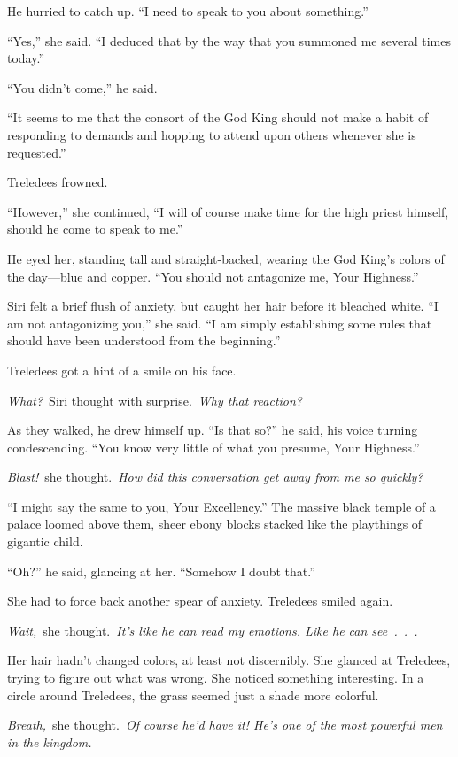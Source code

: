 He hurried to catch up. “I need to speak to you about something.”

“Yes,” she said. “I deduced that by the way that you summoned me several times today.”

“You didn’t come,” he said.

“It seems to me that the consort of the God King should not make a habit of responding to demands and hopping to attend upon others whenever she is requested.”

Treledees frowned.

“However,” she continued, “I will of course make time for the high priest himself, should he come to speak to me.”

He eyed her, standing tall and straight-backed, wearing the God King’s colors of the day—blue and copper. “You should not antagonize me, Your Highness.”

Siri felt a brief flush of anxiety, but caught her hair before it bleached white. “I am not antagonizing you,” she said. “I am simply establishing some rules that should have been understood from the beginning.”

Treledees got a hint of a smile on his face.

\textit{What?}~Siri thought with surprise.~\textit{Why that reaction?}

As they walked, he drew himself up. “Is that so?” he said, his voice turning condescending. “You know very little of what you presume, Your Highness.”

\textit{Blast!}~she thought.~\textit{How did this conversation get away from me so quickly?}

“I might say the same to you, Your Excellency.” The massive black temple of a palace loomed above them, sheer ebony blocks stacked like the playthings of gigantic child.

“Oh?” he said, glancing at her. “Somehow I doubt that.”

She had to force back another spear of anxiety. Treledees smiled again.

\textit{Wait,}~she thought.~\textit{It’s like he can read my emotions. Like he can see~.~.~.}

Her hair hadn’t changed colors, at least not discernibly. She glanced at Treledees, trying to figure out what was wrong. She noticed something interesting. In a circle around Treledees, the grass seemed just a shade more colorful.

\textit{Breath,}~she thought.~\textit{Of course he’d have it! He’s one of the most powerful men in the kingdom.}

